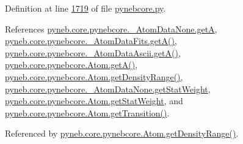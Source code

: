 Definition at line \hyperlink{pynebcore_8py_source_l01719}{1719} of file \hyperlink{pynebcore_8py_source}{pynebcore.\-py}.



References \hyperlink{pynebcore_8py_source_l00067}{pyneb.\-core.\-pynebcore.\-\_\-\-Atom\-Data\-None.\-get\-A}, \hyperlink{pynebcore_8py_source_l00212}{pyneb.\-core.\-pynebcore.\-\_\-\-Atom\-Data\-Fits.\-get\-A()}, \hyperlink{pynebcore_8py_source_l00487}{pyneb.\-core.\-pynebcore.\-\_\-\-Atom\-Data\-Ascii.\-get\-A()}, \hyperlink{pynebcore_8py_source_l01537}{pyneb.\-core.\-pynebcore.\-Atom.\-get\-A()}, \hyperlink{pynebcore_8py_source_l01742}{pyneb.\-core.\-pynebcore.\-Atom.\-get\-Density\-Range()}, \hyperlink{pynebcore_8py_source_l00065}{pyneb.\-core.\-pynebcore.\-\_\-\-Atom\-Data\-None.\-get\-Stat\-Weight}, \hyperlink{pynebcore_8py_source_l01255}{pyneb.\-core.\-pynebcore.\-Atom.\-get\-Stat\-Weight}, and \hyperlink{pynebcore_8py_source_l01472}{pyneb.\-core.\-pynebcore.\-Atom.\-get\-Transition()}.



Referenced by \hyperlink{pynebcore_8py_source_l01742}{pyneb.\-core.\-pynebcore.\-Atom.\-get\-Density\-Range()}.


